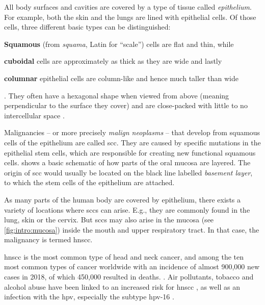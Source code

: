 \documentclass[\relativeRoot/main.tex]{subfiles}
\begin{document}
All body surfaces and cavities are covered by a type of tissue called \emph{epithelium}. For example, both the skin and the lungs are lined with epithelial cells. Of those cells, three different basic types can be distinguished:
\begin{enumerate*}[label={(\arabic*)}]
    \item \textbf{Squamous} (from \emph{squama}, Latin for ``scale'') cells are flat and thin, while 
    \item \textbf{cuboidal} cells are approximately as thick as they are wide and lastly
    \item \textbf{columnar} epithelial cells are column-like and hence much taller than wide
\end{enumerate*}.
They often have a hexagonal shape when viewed from above (meaning perpendicular to the surface they cover) and are close-packed with little to no intercellular space \cite{marieb_human_1995}.

Malignancies -- or more precisely \emph{malign neoplasms} -- that develop from squamous cells of the epithelium are called \gls{scc}. They are caused by specific mutations in the epithelial stem cells, which are responsible for creating new functional squamous cells.  shows a basic schematic of how parts of the oral mucosa are layered. The origin of \gls{scc} would usually be located on the black line labelled \emph{basement layer}, to which the stem cells of the epithelium are attached.

As many parts of the human body are covered by epithelium, there exists a variety of locations where \glspl{scc} can arise. E.g., they are commonly found in the lung, skin or the cervix. But \glspl{scc} may also arise in the mucosa (see \cref{fig:intro:mucosa}) inside the mouth and upper respiratory tract. In that case, the malignancy is termed \gls{hnscc}.

\gls{hnscc} is the most common type of head and neck cancer, and among the ten most common types of cancer worldwide with an incidence of almost 900,000 new cases in 2018, of which 450,000 resulted in deaths. \cite{johnson_head_2020,ferlay_estimating_2019,bray_global_2018}. Air pollutants, tobacco and alcohol abuse have been linked to an increased risk for \gls{hnscc} \cite{johnson_head_2020,wong_cancers_2014}, as well as an infection with the \gls{hpv}, especially the subtype \gls{hpv}-16 \cite{hennessey_human_2009}.
\end{document}
